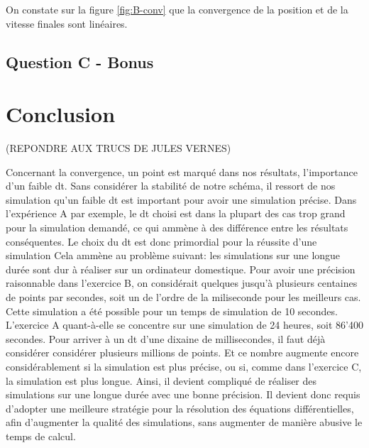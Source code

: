 \documentclass[a4paper,12pt,twoside]{article}
\begin{document}
On constate sur la figure \ref{fig:B-conv} que la convergence de la position et de la vitesse finales sont linéaires.

\subsection{Question C - Bonus}


\section{Conclusion}
(REPONDRE AUX TRUCS DE JULES VERNES)

Concernant la convergence, un point est marqué dans nos résultats, l'importance d'un faible dt.
Sans considérer la stabilité de notre schéma, il ressort de nos simulation qu'un faible dt est important pour avoir une simulation précise.
Dans l'expérience A par exemple, le dt choisi est dans la plupart des cas trop grand pour la simulation demandé, ce qui ammène à des différence entre les résultats conséquentes.
Le choix du dt est donc primordial pour la réussite d'une simulation
Cela ammène au problème suivant: les simulations sur une longue durée sont dur à réaliser sur un ordinateur domestique.
Pour avoir une précision raisonnable dans l'exercice B, on considérait quelques jusqu'à plusieurs centaines de points par secondes, soit un de l'ordre de la miliseconde pour les meilleurs cas.
Cette simulation a été possible pour un temps de simulation de 10 secondes.
L'exercice A quant-à-elle se concentre sur une simulation de 24 heures, soit 86'400 secondes.
Pour arriver à un dt d'une dixaine de millisecondes, il faut déjà considérer considérer plusieurs millions de points.
Et ce nombre augmente encore considérablement si la simulation est plus précise, ou si, comme dans l'exercice C, la simulation est plus longue.
Ainsi, il devient compliqué de réaliser des simulations sur une longue durée avec une bonne précision.
Il devient donc requis d'adopter une meilleure stratégie pour la résolution des équations différentielles, afin d'augmenter la qualité des simulations, sans augmenter de manière abusive le temps de calcul.
\end{document}
